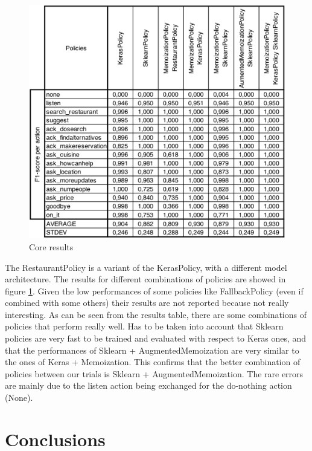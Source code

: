 \documentclass[11pt,a4paper]{article}
\begin{document}
\begin{figure}
  \includegraphics[scale=0.22]{core_results}
  \caption{Core results}
  \label{fig:results2}
\end{figure}

The RestaurantPolicy is a variant of the KerasPolicy, with a different model architecture. The results for different combinations of policies are showed in figure \ref{fig:results2}. Given the low performances of some policies like FallbackPolicy (even if combined with some others) their results are not reported because not really interesting. As can be seen from the results table, there are some combinations of policies that perform really well. Has to be taken into account that Sklearn policies are very fast to be trained and evaluated with respect to Keras ones, and that the performances of Sklearn + AugmentedMemoization are very similar to the ones of Keras + Memoization. This confirms that the better combination of policies between our trials is Sklearn + AugmentedMemoization. The rare errors are mainly due to the listen action being exchanged for the do-nothing action (None).

\section{Conclusions}
\end{document}
